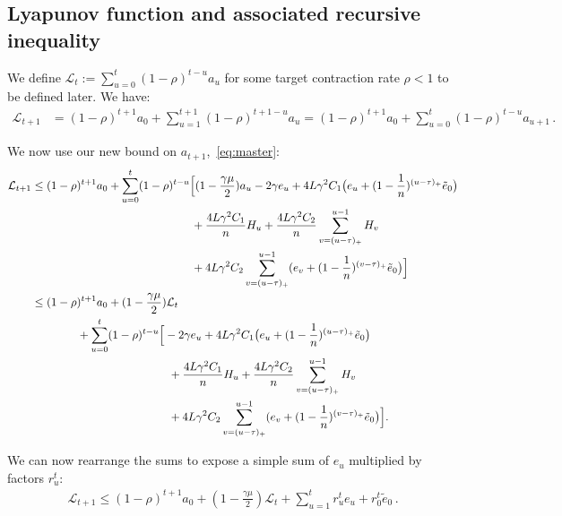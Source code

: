 \documentclass[twoside]{article}
\newcommand{\stepsize}{\gamma}
\newcommand{\strongconvex}{\mu}
\newcommand{\overlap}{\tau}
\newcommand{\contraction}{\rho}
\newcommand{\lipschitz}{L}
\newcommand{\lyapunov}{\mathcal{L}}
\begin{document}
\subsection{Lyapunov function and associated recursive inequality}\label{apxB:lyapunov}
We define $\lyapunov_t := \sum_{u=0}^t (1-\contraction)^{t-u}a_u$ for some target contraction rate $\contraction < 1$ to be defined later.
We have:
\begin{align}
\lyapunov_{t+1} 
&= (1 - \contraction)^{t+1}a_0 
	+ \sum_{u=1}^{t+1}(1 - \contraction)^{t+1-u}a_u
= (1 - \contraction)^{t+1}a_0 
	+ \sum_{u=0}^t(1 - \contraction)^{t-u}a_{u+1} \,  .
\end{align}

We now use our new bound on $a_{t+1}$,~\eqref{eq:master}:
\begin{align} \label{eq:rutMaster}
\lyapunov_{t+1} 
&\leq (1 - \contraction)^{t+1}a_0 
	+ \sum_{u = 0}^t(1 - \contraction)^{t-u} \Big[
		(1 - \frac{\stepsize\strongconvex}{2}) a_u 
		- 2\stepsize e_u
		+ 4\lipschitz\stepsize^2 C_1 \big(e_u  + (1 - \frac{1}{n})^{(u-\overlap)_+} \tilde e_0 \big)
\notag \\		
		&\qquad \qquad \qquad \qquad \qquad \qquad \qquad 
		+ \frac{4\lipschitz\stepsize^2 C_1}{n} H_u
		+\frac{4\lipschitz\stepsize^2 C_2}{n} \sum_{v=(u-\overlap)_+}^{u-1} H_v	
\notag \\		
		&\qquad \qquad \qquad \qquad \qquad \qquad \qquad 
		+4\lipschitz\stepsize^2 C_2\sum_{v=(u-\overlap)_+}^{u-1} (e_v +  (1 - \frac{1}{n})^{(v - \overlap)_+} \tilde e_0 \big)
	\Big]
\notag \\
&\leq (1 - \contraction)^{t+1}a_0 
	+ (1-\frac{\stepsize\strongconvex}{2})\lyapunov_t 
\notag \\
	&\qquad \qquad + \sum_{u = 0}^t(1 - \contraction)^{t-u} \Big[
		- 2\stepsize e_u
		+ 4\lipschitz\stepsize^2 C_1 \big(e_u  + (1 - \frac{1}{n})^{(u-\overlap)_+} \tilde e_0 \big)
\notag \\		
		&\qquad \qquad \qquad \qquad \qquad \qquad
		+ \frac{4\lipschitz\stepsize^2 C_1}{n} H_u
		+\frac{4\lipschitz\stepsize^2 C_2}{n} \sum_{v=(u-\overlap)_+}^{u-1} H_v	
\notag \\
		&\qquad \qquad \qquad \qquad \qquad \qquad
		+4\lipschitz\stepsize^2 C_2\sum_{v=(u-\overlap)_+}^{u-1} (e_v +  (1 - \frac{1}{n})^{(v - \overlap)_+} \tilde e_0 \big)
	\Big] .
\end{align}

We can now rearrange the sums to expose a simple sum of $e_u$ multiplied by factors $r_u^t$:
\begin{align}\label{apx:Lyapunov}
\lyapunov_{t+1} \leq (1 - \contraction)^{t+1}a_0 + (1-\frac{\stepsize\strongconvex}{2})\lyapunov_t + \sum_{u=1}^t r_u^t e_u + r_0^t \tilde e_0  \, .
\end{align}
\end{document}
